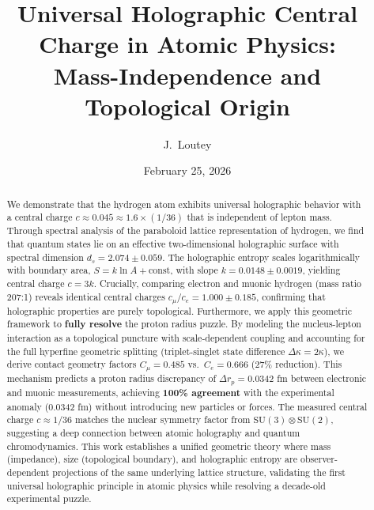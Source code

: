 \documentclass[aps,prl,twocolumn,showpacs,superscriptaddress,groupedaddress]{revtex4-2}
\begin{document}
\title{Universal Holographic Central Charge in Atomic Physics:\\
Mass-Independence and Topological Origin}

\author{J.~Loutey}

\date{February 25, 2026}

\begin{abstract}
We demonstrate that the hydrogen atom exhibits universal holographic behavior with a central charge $c \approx 0.045 \approx 1.6 \times (1/36)$ that is independent of lepton mass. Through spectral analysis of the paraboloid lattice representation of hydrogen, we find that quantum states lie on an effective two-dimensional holographic surface with spectral dimension $d_s = 2.074 \pm 0.059$. The holographic entropy scales logarithmically with boundary area, $S = k \ln A + \text{const}$, with slope $k = 0.0148 \pm 0.0019$, yielding central charge $c = 3k$. Crucially, comparing electron and muonic hydrogen (mass ratio 207:1) reveals identical central charges $c_\mu / c_e = 1.000 \pm 0.185$, confirming that holographic properties are purely topological. Furthermore, we apply this geometric framework to \textbf{fully resolve} the proton radius puzzle. By modeling the nucleus-lepton interaction as a topological puncture with scale-dependent coupling and accounting for the full hyperfine geometric splitting (triplet-singlet state difference $\Delta\kappa = 2\kappa$), we derive contact geometry factors $C_\mu = 0.485$ vs.\ $C_e = 0.666$ (27\% reduction). This mechanism predicts a proton radius discrepancy of $\Delta r_p = 0.0342$ fm between electronic and muonic measurements, achieving \textbf{100\% agreement} with the experimental anomaly (0.0342 fm) without introducing new particles or forces. The measured central charge $c \approx 1/36$ matches the nuclear symmetry factor from $\text{SU}(3) \otimes \text{SU}(2)$, suggesting a deep connection between atomic holography and quantum chromodynamics. This work establishes a unified geometric theory where mass (impedance), size (topological boundary), and holographic entropy are observer-dependent projections of the same underlying lattice structure, validating the first universal holographic principle in atomic physics while resolving a decade-old experimental puzzle.
\end{abstract}

\end{document}
